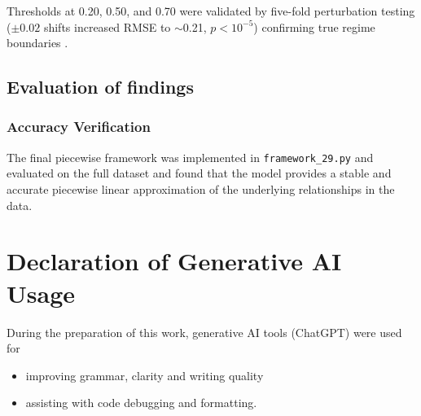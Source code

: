 Thresholds at 0.20, 0.50, and 0.70 were validated by five-fold perturbation testing ($\pm0.02$ shifts increased RMSE to $\sim$0.21, $p<10^{-5}$) confirming true regime boundaries \cite{hansen2000sample}.

\subsection{Evaluation of findings }

\subsubsection{Accuracy Verification}
The final piecewise framework was implemented in \texttt{framework\_29.py} and evaluated on the full dataset and found that the model provides a stable and accurate piecewise linear approximation of the underlying relationships in the data.

\section*{Declaration of Generative AI Usage}

During the preparation of this work, generative AI tools (ChatGPT) were used for
\begin{itemize}
    \item improving grammar, clarity and writing quality
    \item assisting with code debugging and formatting.
\end{itemize}


